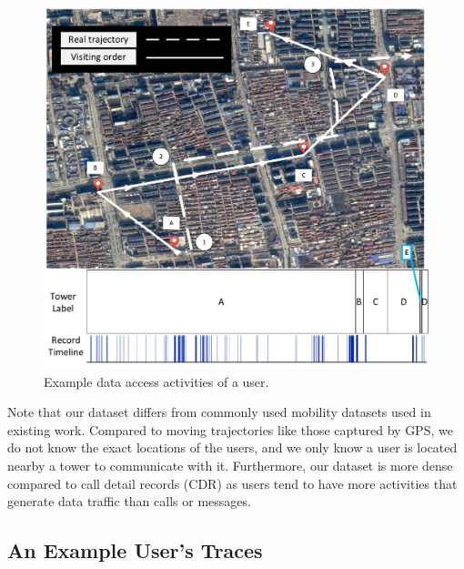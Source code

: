 \begin{figure}[h]
    \centering
		\vspace{-0.15in}
    \includegraphics[width=\linewidth]{./figures/typical_user.pdf}
		\vspace{-0.1in}
    \caption{Example data access activities of a user.}
    \label{fig:typical_user}
    \vspace{-0.1in}
\end{figure}

Note that our dataset differs from commonly used mobility datasets used in existing work.
Compared to moving trajectories like those captured by GPS,
we do not know the exact locations of the users, and we only know a user is located nearby a tower to communicate with it.
Furthermore, our dataset is more dense compared to call detail records (CDR) as users tend to have more activities that generate data traffic than calls or messages.


\subsection{An Example User's Traces}

